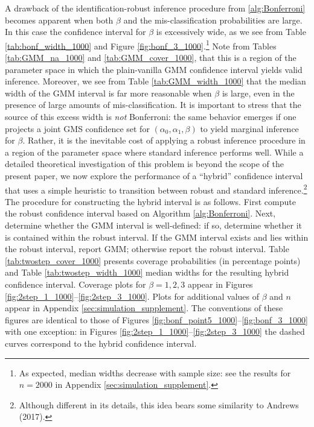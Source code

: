 A drawback of the identification-robust inference procedure from \ref{alg:Bonferroni} becomes apparent when both $\beta$ and the mis-classification probabilities are large.
In this case the confidence interval for $\beta$ is excessively wide, as we see from Table \ref{tab:bonf_width_1000} and Figure \ref{fig:bonf_3_1000}.\footnote{As expected, median widths decrease with sample size: see the results for $n = 2000$ in Appendix \ref{sec:simulation_supplement}.}
Note from Tables \ref{tab:GMM_na_1000} and \ref{tab:GMM_cover_1000}, that this is a region of the parameter space in which the plain-vanilla GMM confidence interval yields valid inference.
Moreover, we see from Table \ref{tab:GMM_width_1000} that the median width of the GMM interval is far more reasonable when $\beta$ is large, even in the presence of large amounts of mis-classification.
It is important to stress that the source of this excess width is \emph{not} Bonferroni: the same behavior emerges if one projects a joint GMS confidence set for $(\alpha_0, \alpha_1, \beta)$ to yield marginal inference for $\beta$.
Rather, it is the inevitable cost of applying a robust inference procedure in a region of the parameter space where standard inference performs well.
While a detailed theoretical investigation of this problem is beyond the scope of the present paper, we now explore the performance of a ``hybrid'' confidence interval that uses a simple heuristic to transition between robust and standard inference.\footnote{Although different in its details, this idea bears some similarity to Andrews (2017).}
The procedure for constructing the hybrid interval is as follows.
First compute the robust confidence interval based on Algorithm \ref{alg:Bonferroni}.
Next, determine whether the GMM interval is well-defined: if so, determine whether it is contained within the robust interval.
If the GMM interval exists and lies within the robust interval, report GMM; otherwise report the robust interval.
Table \ref{tab:twostep_cover_1000} presents coverage probabilities (in percentage points) and Table \ref{tab:twostep_width_1000} median widths for the resulting hybrid confidence interval.
Coverage plots for $\beta = 1, 2, 3$ appear in Figures \ref{fig:2step_1_1000}--\ref{fig:2step_3_1000}.
Plots for additional values of $\beta$ and $n$ appear in Appendix \ref{sec:simulation_supplement}.
The conventions of these figures are identical to those of Figures \ref{fig:bonf_point5_1000}--\ref{fig:bonf_3_1000} with one exception: in Figures \ref{fig:2step_1_1000}--\ref{fig:2step_3_1000} the dashed curves correspond to the hybrid confidence interval.

